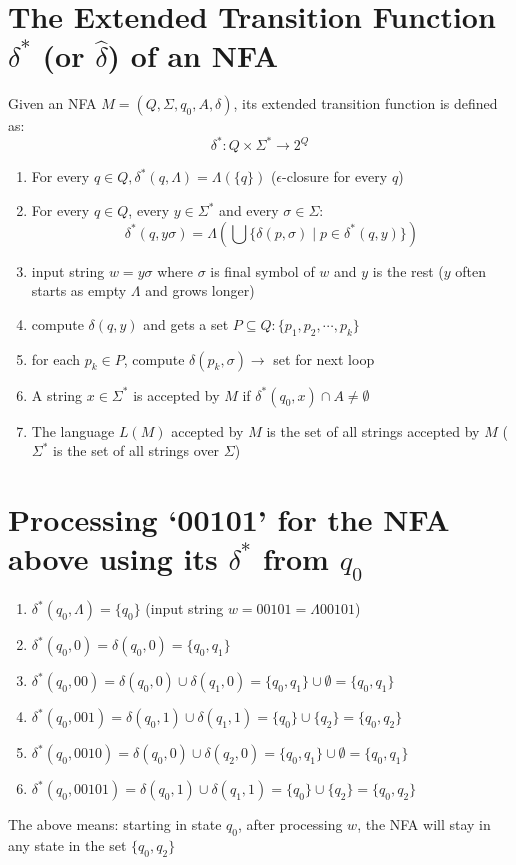 \section*{The Extended Transition Function $\delta^{*}$ (or $\hat{\delta}$) of an NFA}
Given an NFA $M = (Q,\Sigma,q_{0},A,\delta)$, its extended transition function is defined as:
\begin{equation*}
  {\delta^{*}}: Q \times \Sigma^{*} \to 2^{Q}
\end{equation*}
\begin{enumerate}
\item For every $q \in Q, \delta^{*}(q,\Lambda) = \Lambda(\{q\})$ ($\epsilon$-closure for every $q$)
\item For every $q \in Q$, every $y \in \Sigma^{*}$ and every $\sigma \in \Sigma$:
  \begin{equation*}
    \delta^{*}(q,y\sigma) = \Lambda\left(\bigcup\{\delta(p,\sigma)\;|\;p \in \delta^{*}(q,y)\}\right)
  \end{equation*}
\item input string $w = y\sigma$ where $\sigma$ is final symbol of $w$ and $y$ is the rest ($y$ often starts as empty $\Lambda$ and grows longer)
\item {} compute $\delta(q,y)$ and gets a set $P\subseteq Q:\{p_{1},p_{2},\cdots,p_{k}\}$
\item {} for each $p_{k} \in P$, compute $\delta(p_{k},\sigma) \to$ set for next loop
\item A string $x \in \Sigma^{*}$ is accepted by $M$ if $\delta^{*}(q_{0},x) \cap A \neq \emptyset$
\item The language $L(M)$ accepted by $M$ is the set of all strings accepted by $M$ ($\Sigma^{*}$ is the set of all strings over $\Sigma$)
\end{enumerate}
\section*{Processing `00101' for the NFA above using its $\delta^{*}$ from $q_{0}$}
\begin{enumerate}
\item $\delta^{*}(q_{0},\Lambda) = \{q_{0}\}$ (input string $w = 00101 = \Lambda 00101$)
\item $\delta^{*}(q_{0},0) = \delta(q_{0},0) = \{q_{0}, q_{1}\}$
\item $\delta^{*}(q_{0},00) = \delta(q_{0},0) \cup \delta(q_{1},0) = \{q_{0}, q_{1}\} \cup \emptyset = \{q_{0}, q_{1}\}$
\item $\delta^{*}(q_{0},001) = \delta(q_{0},1) \cup \delta(q_{1},1) = \{q_{0}\} \cup \{q_{2}\} = \{q_{0}, q_{2}\}$
\item $\delta^{*}(q_{0},0010) = \delta(q_{0},0) \cup \delta(q_{2},0) = \{q_{0}, q_{1}\} \cup \emptyset = \{q_{0}, q_{1}\}$
\item $\delta^{*}(q_{0},00101) = \delta(q_{0},1) \cup \delta(q_{1},1) = \{q_{0}\} \cup \{q_{2}\} = \{q_{0}, q_{2}\}$
\end{enumerate}
The above means: starting in state $q_{0}$, after processing $w$, the NFA will stay in any state in the set $\{q_{0},q_{2}\}$

